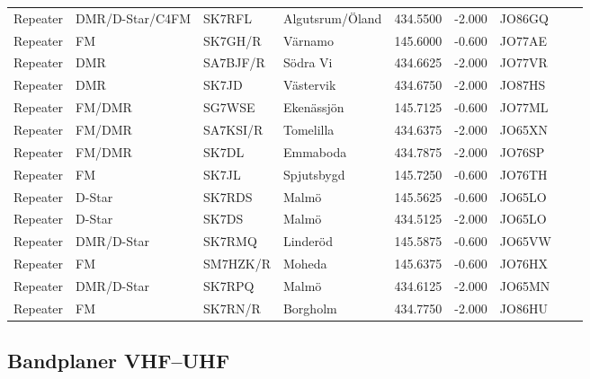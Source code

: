 \begin{longtable}{llllrrlcl}
	Repeater & DMR/D-Star/C4FM & SK7RFL   & Algutsrum/Öland         &   434.5500 &   -2.000 & JO86GQ &  \\
	Repeater & FM              & SK7GH/R  & Värnamo                 &   145.6000 &   -0.600 & JO77AE &  \\
	Repeater & DMR             & SA7BJF/R & Södra Vi                &   434.6625 &   -2.000 & JO77VR &  \\
	Repeater & DMR             & SK7JD    & Västervik               &   434.6750 &   -2.000 & JO87HS &  \\
	Repeater & FM/DMR          & SG7WSE   & Ekenässjön              &   145.7125 &   -0.600 & JO77ML &  \\
	Repeater & FM/DMR          & SA7KSI/R & Tomelilla               &   434.6375 &   -2.000 & JO65XN &  \\
	Repeater & FM/DMR          & SK7DL    & Emmaboda                &   434.7875 &   -2.000 & JO76SP &  \\
	Repeater & FM              & SK7JL    & Spjutsbygd              &   145.7250 &   -0.600 & JO76TH &  \\
	Repeater & D-Star          & SK7RDS   & Malmö                   &   145.5625 &   -0.600 & JO65LO &  \\
	Repeater & D-Star          & SK7DS    & Malmö                   &   434.5125 &   -2.000 & JO65LO &  \\
	Repeater & DMR/D-Star      & SK7RMQ   & Linderöd                &   145.5875 &   -0.600 & JO65VW &  \\
	Repeater & FM              & SM7HZK/R & Moheda                  &   145.6375 &   -0.600 & JO76HX &  \\
	Repeater & DMR/D-Star      & SK7RPQ   & Malmö                   &   434.6125 &   -2.000 & JO65MN &  \\
	Repeater & FM              & SK7RN/R  & Borgholm                &   434.7750 &   -2.000 & JO86HU &
\end{longtable}

\normalsize


\scriptsize
\subsection{Bandplaner VHF--UHF}
